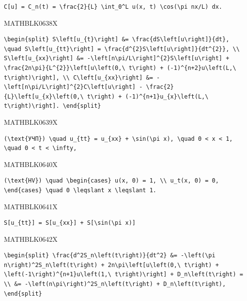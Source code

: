 \documentclass[
  ukrainian,
]{article}
\begin{document}
\begin{verbatim}
C[u] = C_n(t) = \frac{2}{L} \int_0^L u(x, t) \cos(\pi nx/L) dx.
\end{verbatim}

MATHBLK0638X

\begin{verbatim}
\begin{split} S\left[u_{t}\right] &= \frac{dS\left[u\right]}{dt}, \quad S\left[u_{tt}\right] = \frac{d^{2}S\left[u\right]}{dt^{2}}, \\ S\left[u_{xx}\right] &= -\left[n\pi/L\right]^{2}S\left[u\right] + \frac{2n\pi}{L^{2}}\left[u\left(0,\ t\right) + (-1)^{n+2}u\left(L,\  t\right)\right], \\ C\left[u_{xx}\right] &= -\left[n\pi/L\right]^{2}C\left[u\right] - \frac{2}{L}\left[u_{x}\left(0,\ t\right) + (-1)^{n+1}u_{x}\left(L,\ t\right)\right]. \end{split}
\end{verbatim}

MATHBLK0639X

\begin{verbatim}
(\text{УЧП}) \quad u_{tt} = u_{xx} + \sin(\pi x), \quad 0 < x < 1, \quad 0 < t < \infty,
\end{verbatim}

MATHBLK0640X

\begin{verbatim}
(\text{HV}) \quad \begin{cases} u(x, 0) = 1, \\ u_t(x, 0) = 0, \end{cases} \quad 0 \leqslant x \leqslant 1.
\end{verbatim}

MATHBLK0641X

\begin{verbatim}
S[u_{tt}] = S[u_{xx}] + S[\sin(\pi x)]
\end{verbatim}

MATHBLK0642X

\begin{verbatim}
\begin{split} \frac{d^2S_n\left(t\right)}{dt^2} &= -\left(\pi n\right)^2S_n\left(t\right) + 2n\pi\left[u\left(0,\ t\right) + \left(-1\right)^{n+1}u\left(1,\ t\right)\right] + D_n\left(t\right) = \\ &= -\left(n\pi\right)^2S_n\left(t\right) + D_n\left(t\right),  \end{split}
\end{verbatim}
\end{document}
